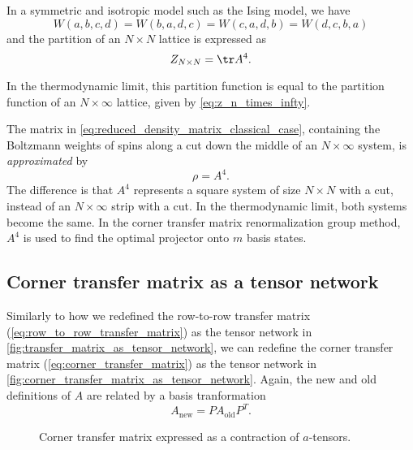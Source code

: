 In a symmetric and isotropic model such as the Ising model, we have
\begin{equation}
  W(a, b, c, d) = W(b, a, d, c) = W(c, a, d, b) = W(d, c, b, a)
\end{equation}
and the partition of an $N \times N$ lattice is expressed as
\begin{equation}\label{z_n_times_n}
  Z_{N \times N} = \tr A^4.
\end{equation}

In the thermodynamic limit, this partition function is equal to
the partition function of an $N \times \infty$ lattice, given by
\autoref{eq:z_n_times_infty}.

The matrix in \autoref{eq:reduced_density_matrix_classical_case}, containing the Boltzmann
weights of spins along a cut down the middle of an $N \times \infty$ system, is
\textit{approximated} by
\begin{equation}
  \rho = A^4.
\end{equation}
The difference is that $A^4$ represents a square system of size $N \times N$ with a
cut, instead of an $N \times \infty$ strip with a cut. In the thermodynamic limit, both
systems become the same. In the corner transfer matrix renormalization group method, $A^4$
is used to find the optimal projector onto $m$ basis states.

\subsection{Corner transfer matrix as a tensor network}
Similarly to how we redefined the row-to-row transfer matrix
(\autoref{eq:row_to_row_transfer_matrix}) as the tensor network in
\autoref{fig:transfer_matrix_as_tensor_network}, we can redefine the corner transfer
matrix (\autoref{eq:corner_transfer_matrix}) as the tensor network in
\autoref{fig:corner_transfer_matrix_as_tensor_network}. Again, the new and old definitions
of $A$ are related by a basis tranformation
\begin{equation}
  A_{\text{new}} = P A_{\text{old}} P^T.
\end{equation}


\begin{figure}
  
  \caption{Corner transfer matrix expressed as a contraction of $a$-tensors.}
  \label{fig:corner_transfer_matrix_as_tensor_network}
\end{figure}

